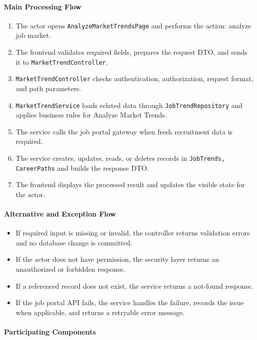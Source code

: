 \paragraph{Main Processing Flow}

\begin{enumerate}
    \item The actor opens \texttt{AnalyzeMarketTrendsPage} and performs the action: analyze job market.
    \item The frontend validates required fields, prepares the request DTO, and sends it to \texttt{MarketTrendController}.
    \item \texttt{MarketTrendController} checks authentication, authorization, request format, and path parameters.
    \item \texttt{MarketTrendService} loads related data through \texttt{JobTrendRepository} and applies business rules for Analyze Market Trends.
    \item The service calls the job portal gateway when fresh recruitment data is required.
    \item The service creates, updates, reads, or deletes records in \texttt{JobTrends, CareerPaths} and builds the response DTO.
    \item The frontend displays the processed result and updates the visible state for the actor.
\end{enumerate}

\paragraph{Alternative and Exception Flow}

\begin{itemize}
    \item If required input is missing or invalid, the controller returns validation errors and no database change is committed.
    \item If the actor does not have permission, the security layer returns an unauthorized or forbidden response.
    \item If a referenced record does not exist, the service returns a not-found response.
    \item If the job portal API fails, the service handles the failure, records the issue when applicable, and returns a retryable error message.
\end{itemize}

\paragraph{Participating Components}

